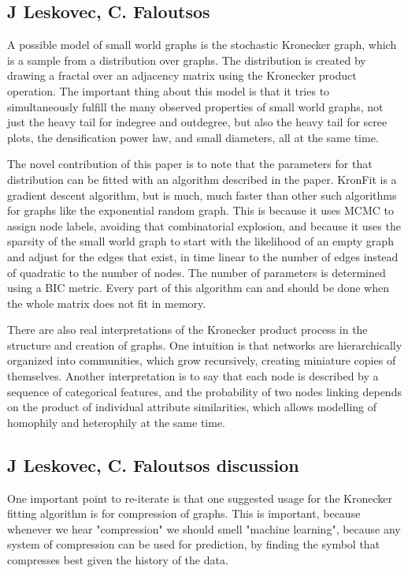 \documentclass[12pt]{article}
\begin{document}
\subsection{J Leskovec, C. Faloutsos}
A possible model of small world graphs is the stochastic Kronecker graph, which is a sample from a distribution over graphs. The distribution is created by drawing a fractal over an adjacency matrix using the Kronecker product operation. The important thing about this model is that it tries to simultaneously fulfill the many observed properties of small world graphs, not just the heavy tail for indegree and outdegree, but also the heavy tail for scree plots, the densification power law, and small diameters, all at the same time.

The novel contribution of this paper is to note that the parameters for that distribution can be fitted with an algorithm described in the paper. KronFit is a gradient descent algorithm, but is much, much faster than other such algorithms for graphs like the exponential random graph. This is because it uses MCMC to assign node labels, avoiding that combinatorial explosion, and because it uses the sparsity of the small world graph to start with the likelihood of an empty graph and adjust for the edges that exist, in time linear to the number of edges instead of quadratic to the number of nodes. The number of parameters is determined using a BIC metric. Every part of this algorithm can and should be done when the whole matrix does not fit in memory.

There are also real interpretations of the Kronecker product process in the structure and creation of graphs. One intuition is that networks are hierarchically organized into communities, which grow recursively, creating miniature copies of themselves. Another interpretation is to say that each node is described by a sequence of categorical features, and the probability of two nodes linking depends on the product of individual attribute similarities, which allows modelling of homophily and heterophily at the same time.

\subsection{J Leskovec, C. Faloutsos discussion}

One important point to re-iterate is that one suggested usage for the Kronecker fitting algorithm is for compression of graphs. This is important, because whenever we hear "compression" we should smell "machine learning", because any system of compression can be used for prediction, by finding the symbol that compresses best given the history of the data. %
\end{document}
